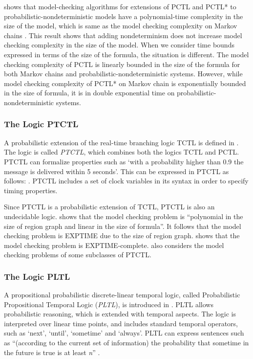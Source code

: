 \documentclass[11pt]{article}
\begin{document}
\cite{BA95} shows that model-checking algorithms for extensions of PCTL and PCTL* to probabilistic-nondeterministic models have a polynomial-time complexity in the size of the model, which is same as the model checking complexity on Markov chains  \cite{HJ89,HJ94,ASB95}. This result shows that adding nondeterminism does not increase model checking complexity in the size of the model. When we consider time bounds expressed in terms of the size of the formula, the situation is different. The model checking complexity of PCTL is linearly bounded in the size of the formula for both Markov chains and probabilistic-nondeterministic systems. However, while model checking complexity of PCTL* on Markov chain is exponentially bounded in the size of formula, it is in double exponential time on probabilistic-nondeterministic systems. 

\subsubsection{The Logic PTCTL}

A probabilistic extension of the real-time branching logic TCTL is defined in \cite{KNR99}. The logic is called \emph{PTCTL}, which combines both the logics TCTL and PCTL. PTCTL can formalize properties such as `with a probability higher than 0.9 the message is delivered within 5 seconds'. This can be expressed in PTCTL as follows: .  PTCTL includes a set of clock variables in its syntax in order to specify timing properties. 

Since PTCTL is a probabilistic extension of TCTL, PTCTL is also an undecidable logic. \cite{KNR99} shows that the model checking problem is ``polynomial in the size of region graph and linear in the size of formula''. It follows that the model checking problem is EXPTIME due to the size of region graph. \cite{JLS07} shows that the model checking problem is EXPTIME-complete. \cite{JLS07} also considers the model checking problems of some subclasses of PTCTL.  

\subsubsection{The Logic PLTL}
A propositional probabilistic discrete-linear temporal logic, called Probabilistic Propositional Temporal Logic (\textit{PLTL}), is introduced in \cite{Ogn06}. PLTL allows probabilistic reasoning, which is extended with temporal aspects. The logic is interpreted over linear time points, and includes standard temporal operators, such as `next', `until', `sometime' and `always'. PLTL can express sentences such as ``(according to the current set of information) the probability that sometime in the future  is true is at least \textit{n}''  \cite{Ogn06}.
\end{document}
